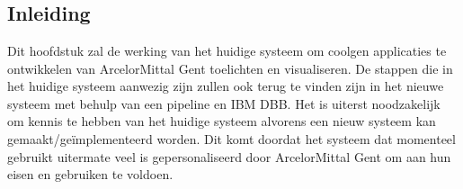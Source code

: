 
\chapter{}%
\label{ch:current system}

\section{Inleiding}
\label{sec:inleiding_currsys}
Dit hoofdstuk zal de werking van het huidige systeem om coolgen applicaties te ontwikkelen van ArcelorMittal Gent toelichten en visualiseren. De stappen die in het huidige systeem aanwezig zijn zullen ook terug te vinden zijn in het nieuwe systeem met behulp van een pipeline en IBM DBB. Het is uiterst noodzakelijk om kennis te hebben van het huidige systeem alvorens een nieuw systeem kan gemaakt/geïmplementeerd worden. Dit komt doordat het systeem dat momenteel gebruikt uitermate veel is gepersonaliseerd door ArcelorMittal Gent om aan hun eisen en gebruiken te voldoen. 

